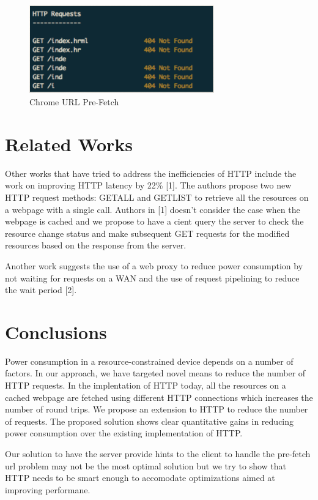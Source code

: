 \documentclass{sigplanconf}
\begin{document}
\begin{figure}[ht!]
\centering
\includegraphics[width=80mm]{chrome}
\caption{Chrome URL Pre-Fetch}
\label{fig:sp_gd_mnist}
\end{figure}



\section{ Related Works}

Other works that have tried to address the inefficiencies of HTTP include the work on improving HTTP latency by 22\% [1]. The authors propose two new HTTP request methods: GETALL and GETLIST to retrieve all the resources on a webpage with a single call. Authors in [1] doesn't consider the case when the webpage is cached and  we propose to have a cient query the server to check the resource change status and make subsequent GET requests for the modified resources based on the response from the server.

Another work suggests the use of a web proxy to reduce power consumption by not waiting for requests on a WAN and the use of request pipelining to reduce the wait period [2].

\section{Conclusions}

Power consumption in a resource-constrained device depends on a number of factors. In our approach, we have targeted novel means to reduce the number of HTTP requests. In the implentation of HTTP today, all the resources on a cached webpage are fetched using different HTTP connections which increases the number of round trips. We propose an extension to HTTP to reduce the number of requests. The proposed solution shows clear quantitative gains in reducing power consumption over the existing implementation of HTTP. 

Our solution to have the server provide hints to the client to handle the pre-fetch url problem may not be the most optimal solution but we try to show that HTTP needs to be smart enough 	to accomodate optimizations aimed at improving performane.
\end{document}

